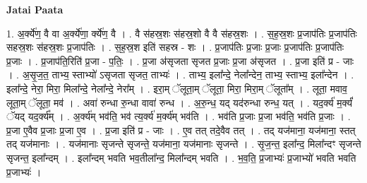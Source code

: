 \documentclass[17pt]{extarticle}
\begin{document}
\textbf{Jatai Paata} \newline

1. अ॒र्क्ये॑ण॒ वै वा अ॒र्क्ये॑णा॒ र्क्ये॑ण॒ वै । . वै स॑हस्र॒शः स॑हस्र॒शो वै वै स॑हस्र॒शः । . स॒ह॒स्र॒शः प्र॒जाप॑तिः प्र॒जाप॑तिः सहस्र॒शः स॑हस्र॒शः प्र॒जाप॑तिः । . स॒ह॒स्र॒श इति॑ सहस्र - शः । . प्र॒जाप॑तिः प्र॒जाः प्र॒जाः प्र॒जाप॑तिः प्र॒जाप॑तिः प्र॒जाः । . प्र॒जाप॑ति॒रिति॑ प्र॒जा - प॒तिः॒ । . प्र॒जा अ॑सृजता सृजत प्र॒जाः प्र॒जा अ॑सृजत । . प्र॒जा इति॑ प्र - जाः । . अ॒सृ॒ज॒त॒ ताभ्य॒ स्ताभ्यो॑ ऽसृजता सृजत॒ ताभ्यः॑ । . ताभ्य॒ इला᳚न्दे॒ नेला᳚न्देन॒ ताभ्य॒ स्ताभ्य॒ इला᳚न्देन । . इला᳚न्दे॒ नेरा॒ मिरा॒ मिला᳚न्दे॒ नेला᳚न्दे॒ नेरा᳚म् । . इरा॒म् ॅलूता॒म् ॅलूता॒ मिरा॒ मिरा॒म् ॅलूता᳚म् । . लूता॒ मवाव॒ लूता॒म् ॅलूता॒ मव॑ । . अवा॑ रुन्धा रु॒न्धा वावा॑ रुन्ध । . अ॒रु॒न्ध॒ यद् यद॑रुन्धा रुन्ध॒ यत् । . यद॒र्क्य॑ म॒र्क्यं॑ ॅयद् यद॒र्क्य᳚म् । . अ॒र्क्य॑म् भव॑ति॒ भव॑ त्य॒र्क्य॑ म॒र्क्य॑म् भव॑ति । . भव॑ति प्र॒जाः प्र॒जा भव॑ति॒ भव॑ति प्र॒जाः । . प्र॒जा ए॒वैव प्र॒जाः प्र॒जा ए॒व । . प्र॒जा इति॑ प्र - जाः । . ए॒व तत् तदे॒वैव तत् । . तद् यज॑माना॒ यज॑माना॒ स्तत् तद् यज॑मानाः । . यज॑मानाः सृजन्ते सृजन्ते॒ यज॑माना॒ यज॑मानाः सृजन्ते । . सृ॒ज॒न्त॒ इला᳚न्द॒ मिला᳚न्दꣳ सृजन्ते सृजन्त॒ इला᳚न्दम् । . इला᳚न्दम् भवति भव॒तीला᳚न्द॒ मिला᳚न्दम् भवति । . भ॒व॒ति॒ प्र॒जाभ्यः॑ प्र॒जाभ्यो॑ भवति भवति प्र॒जाभ्यः॑ । \newline
\end{document}
